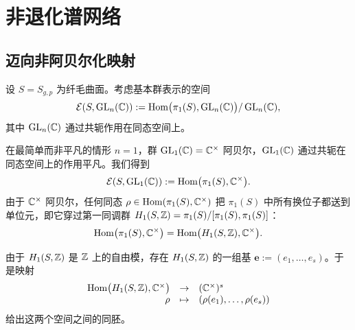 
\chapter{非退化谱网络}


\section{迈向非阿贝尔化映射}

设 $S=S_{g,p}$ 为纤毛曲面。考虑基本群表示的空间
\[
\mathcal{E}(S,\operatorname{GL}_n(\mathbb{C})):=\operatorname{Hom}\bigl(\pi_1(S),\operatorname{GL}_n(\mathbb{C})\bigr)/\operatorname{GL}_n(\mathbb{C}),
\]
其中 $\operatorname{GL}_n(\mathbb{C})$ 通过共轭作用在同态空间上。

\begin{example}[13.1]
在最简单而非平凡的情形 $n=1$，群 $\operatorname{GL}_1(\mathbb{C})=\mathbb{C}^\times$ 阿贝尔，$\operatorname{GL}_1(\mathbb{C})$ 通过共轭在同态空间上的作用平凡。我们得到
\[
\mathcal{E}(S,\operatorname{GL}_1(\mathbb{C})):=\operatorname{Hom}\bigl(\pi_1(S),\mathbb{C}^\times\bigr).
\]
由于 $\mathbb{C}^\times$ 阿贝尔，任何同态 $\rho\in\operatorname{Hom}(\pi_1(S),\mathbb{C}^\times)$ 把 $\pi_1(S)$ 中所有换位子都送到单位元，即它穿过第一同调群 $H_1(S,\mathbb{Z})=\pi_1(S)/[\pi_1(S),\pi_1(S)]$：
\[
\operatorname{Hom}\bigl(\pi_1(S),\mathbb{C}^\times\bigr)=\operatorname{Hom}\bigl(H_1(S,\mathbb{Z}),\mathbb{C}^\times\bigr).
\]
\end{example}

由于 $H_1(S,\mathbb{Z})$ 是 $\mathbb{Z}$ 上的自由模，存在 $H_1(S,\mathbb{Z})$ 的一组基 $\mathbf{e}:=(e_1,\dots,e_s)$。于是映射
\[
\begin{array}{rcl}
\operatorname{Hom}\bigl(H_1(S,\mathbb{Z}),\mathbb{C}^\times\bigr)&\to&(\mathbb{C}^\times)^s\\
\rho&\mapsto&(\rho(e_1),\dots,\rho(e_s))
\end{array}
\]
给出这两个空间之间的同胚。

